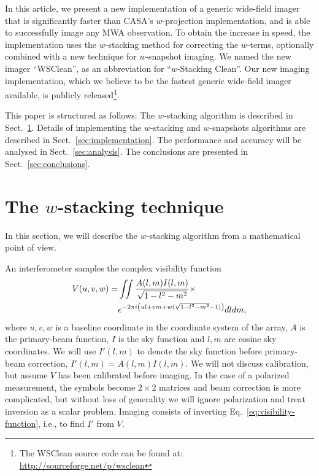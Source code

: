 \documentclass[useAMS,usenatbib]{mn2e}
\begin{document}
In this article, we present a new implementation of a generic wide-field imager that is significantly faster than CASA's $w$-projection implementation, and is able to successfully image any MWA observation. To obtain the increase in speed, the implementation uses the $w$-stacking method for correcting the $w$-terms, optionally combined with a new technique for $w$-snapshot imaging. We named the new imager ``WSClean'', as an abbreviation for ``$w$-Stacking Clean''. Our new imaging implementation, which we believe to be the fastest generic wide-field imager available, is publicly released\footnote{The WSClean source code can be found at:\\\url{http://sourceforge.net/p/wsclean}}.

This paper is structured as follows: The $w$-stacking algorithm is described in Sect.~\ref{sec:wstacking}. Details of implementing the $w$-stacking and $w$-snapshots algorithms are described in Sect.~\ref{sec:implementation}. The performance and accuracy will be analysed in Sect.~\ref{sec:analysis}. The conclusions are presented in Sect.~\ref{sec:conclusions}.

\section{The $w$-stacking technique} \label{sec:wstacking}
In this section, we will describe the $w$-stacking algorithm from a mathematical point of view.

An interferometer samples the complex visibility function
\begin{align}\notag
V(u,v,w) = & \iint \frac{A(l,m) I(l,m)}{\sqrt{1-l^2-m^2}} \times \\ \label{eq:visibility-function}
& e^{-2\pi i \left(ul + vm + w(\sqrt{1-l^2-m^2}-1)\right)} dl dm,
\end{align}
where $u,v,w$ is a baseline coordinate in the coordinate system of the array, $A$ is the primary-beam function, $I$ is the sky function and $l,m$ are cosine sky coordinates. We will use $I'(l,m)$ to denote the sky function before primary-beam correction, $I'(l,m)=A(l,m)I(l,m)$. We will not discuss calibration, but assume $V$ has been calibrated before imaging. In the case of a polarized measurement, the symbols become $2\times 2$ matrices and beam correction is more complicated, but without loss of generality we will ignore polarization and treat inversion as a scalar problem. Imaging consists of inverting Eq.~\eqref{eq:visibility-function}, i.e., to find $I'$ from $V$.
\end{document}
